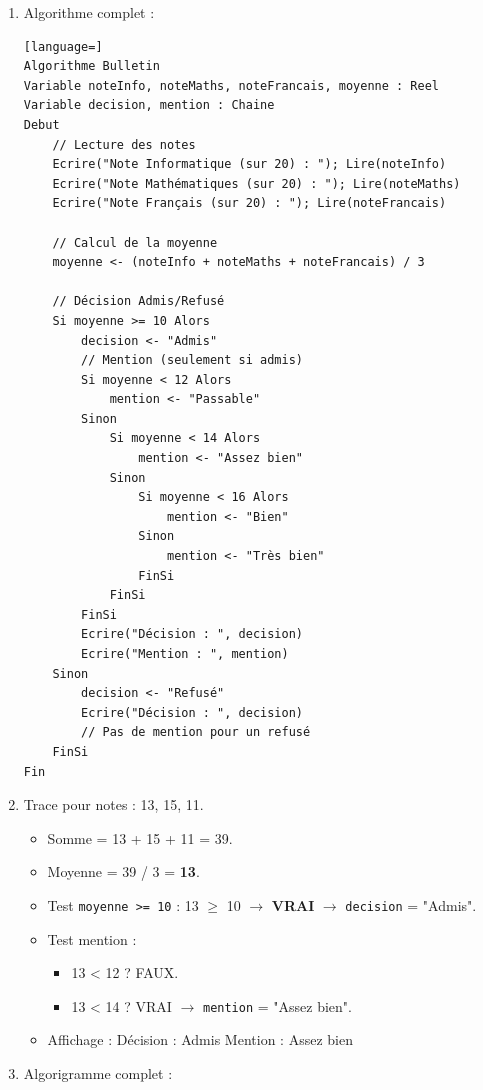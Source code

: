 \documentclass[11pt]{article}
\begin{document}
\begin{corrige}
\begin{enumerate}
\item Algorithme complet :
\begin{lstlisting}[language=]
Algorithme Bulletin
Variable noteInfo, noteMaths, noteFrancais, moyenne : Reel
Variable decision, mention : Chaine
Debut
    // Lecture des notes
    Ecrire("Note Informatique (sur 20) : "); Lire(noteInfo)
    Ecrire("Note Mathématiques (sur 20) : "); Lire(noteMaths)
    Ecrire("Note Français (sur 20) : "); Lire(noteFrancais)
    
    // Calcul de la moyenne
    moyenne <- (noteInfo + noteMaths + noteFrancais) / 3
    
    // Décision Admis/Refusé
    Si moyenne >= 10 Alors
        decision <- "Admis"
        // Mention (seulement si admis)
        Si moyenne < 12 Alors
            mention <- "Passable"
        Sinon
            Si moyenne < 14 Alors
                mention <- "Assez bien"
            Sinon
                Si moyenne < 16 Alors
                    mention <- "Bien"
                Sinon
                    mention <- "Très bien"
                FinSi
            FinSi
        FinSi
        Ecrire("Décision : ", decision)
        Ecrire("Mention : ", mention)
    Sinon
        decision <- "Refusé"
        Ecrire("Décision : ", decision)
        // Pas de mention pour un refusé
    FinSi
Fin
\end{lstlisting}
\item Trace pour notes : 13, 15, 11.
\begin{itemize}
\item Somme = 13 + 15 + 11 = 39.
\item Moyenne = 39 / 3 = \textbf{13}.
\item Test \texttt{moyenne >= 10} : 13 $\ge$ 10 $\rightarrow$ \textbf{VRAI} $\rightarrow$ \texttt{decision} = "Admis".
\item Test mention :
\begin{itemize}
\item 13 < 12 ? FAUX.
\item 13 < 14 ? VRAI $\rightarrow$ \texttt{mention} = "Assez bien".
\end{itemize}
\item Affichage :
\og Décision : Admis \fg{}
\og Mention : Assez bien \fg{}
\end{itemize}
\item Algorigramme complet :
\begin{popfigure}

\end{popfigure}
\end{enumerate}
\end{corrige}
\end{document}
